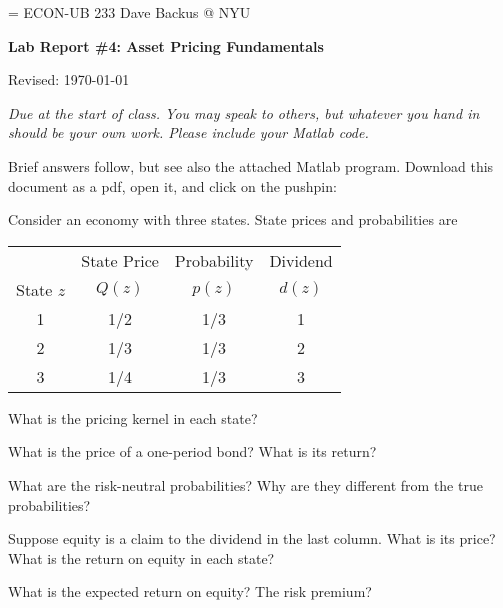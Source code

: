 \documentclass[11pt]{exam}
\begin{document}
\parskip=\bigskipamount
\parindent=0.0in
\thispagestyle{empty}
{\large ECON-UB 233 \hfill Dave Backus @ NYU}

\bigskip\bigskip
\centerline{\Large \bf Lab Report \#4: Asset Pricing Fundamentals}
\centerline{Revised: \today}

\bigskip
{\it Due at the start of class.
You may speak to others, but whatever you hand in should be your own work.
Please include your Matlab code.}

\begin{solution}
Brief answers follow,
but see also the attached Matlab program.
Download this document as a pdf, open it, and click on the pushpin:
\end{solution}


\begin{questions}
Consider an economy with three states.
State prices and probabilities are

\begin{center}
\begin{tabular}{cccc}
\toprule
        & State Price   & Probability &  Dividend  \\
State $z$  &  $Q(z)$    & $p(z)$      &   $d(z)$   \\
\midrule
1       & 1/2 & 1/3 & 1 \\
2       & 1/3 & 1/3 & 2 \\
3       & 1/4 & 1/3 & 3 \\
\bottomrule
\end{tabular}
\end{center}

\smallskip
\begin{parts}
\item What is the pricing kernel in each state?
\item What is the price of a one-period bond?  What is its return?
\item What are the risk-neutral probabilities?
Why are they different from the true probabilities?
\item Suppose equity is a claim to the dividend in the last column.
What is its price? What is the return on equity in each state?
\item What is the expected return on equity?
The risk premium?
\end{parts}


\end{questions}
\end{document}
